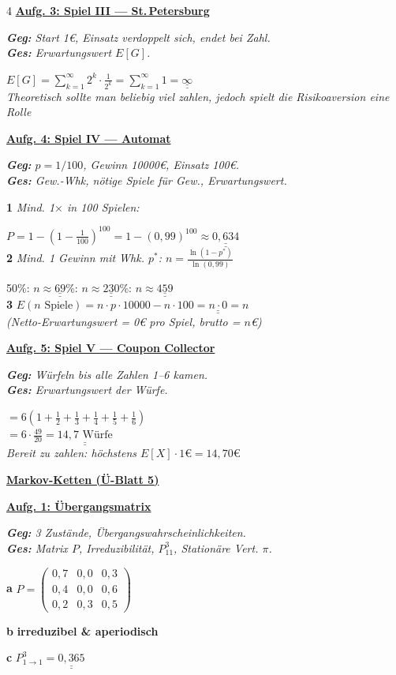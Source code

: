 \documentclass[landscape,a4paper,8pt]{article}
\newcommand{\aufgabe}[1]{\vspace{1pt}\textbf{\underline{#1}}\par}
\newcommand{\blatt}[1]{\smallskip\begin{center}\textbf{\normalsize\underline{#1}}\end{center}\par}
\newcommand{\teil}[1]{\textbf{#1}\;}
\newcommand{\erkl}[1]{{\small\textit{#1}}\par}
\newcommand{\erg}[1]{\underline{\underline{#1}}}
\begin{document}
\begin{multicols*}{4}
\aufgabe{Aufg. 3: Spiel III — St.\,Petersburg}
\erkl{\textbf{Geg:} Start 1€, Einsatz verdoppelt sich, endet bei Zahl.\\\textbf{Ges:} Erwartungswert $E[G]$.}
$E[G]=\displaystyle\sum_{k=1}^{\infty}2^k\cdot\frac{1}{2^k}=\sum_{k=1}^{\infty}1=\erg{\infty}$\\
\erkl{Theoretisch sollte man beliebig viel zahlen, jedoch spielt die Risikoaversion eine Rolle}

\aufgabe{Aufg. 4: Spiel IV — Automat}
\erkl{\textbf{Geg:} $p=1/100$, Gewinn 10000€, Einsatz 100€.\\\textbf{Ges:} Gew.-Whk, nötige Spiele für Gew., Erwartungswert.}
\teil{1} \erkl{Mind. 1$\times$ in 100 Spielen:}
$P=1-(1-\tfrac{1}{100})^{100}=1-(0{,}99)^{100}\approx\erg{0{,}634}$\\
\teil{2} \erkl{Mind. 1 Gewinn mit Whk. $p^*$: $n=\frac{\ln(1-p^*)}{\ln(0{,}99)}$}
50\%: $n\approx\erg{69}$\%: $n\approx\erg{230}$\%: $n\approx\erg{459}$\\
\teil{3} $E(n\text{ Spiele})=n\cdot p\cdot10000-n\cdot100=\erg{n\cdot0}=n$\\
\erkl{(Netto-Erwartungswert = 0€ pro Spiel, brutto = $n$€)}

\aufgabe{Aufg. 5: Spiel V — Coupon Collector}
\erkl{\textbf{Geg:} Würfeln bis alle Zahlen 1–6 kamen.\\\textbf{Ges:} Erwartungswert der Würfe.}
$=6\!\left(1+\tfrac{1}{2}+\tfrac{1}{3}+\tfrac{1}{4}+\tfrac{1}{5}+\tfrac{1}{6}\right)$\\
$=6\cdot\tfrac{49}{20}=\erg{14{,}7\text{ Würfe}}$\\
\erkl{Bereit zu zahlen: höchstens $E[X]\cdot 1\text{€}=14{,}70\text{€}$}


\blatt{Markov-Ketten (Ü-Blatt 5)}

\aufgabe{Aufg. 1: Übergangsmatrix}
\erkl{\textbf{Geg:} 3 Zustände, Übergangswahrscheinlichkeiten.\\\textbf{Ges:} Matrix $P$, Irreduzibilität, $P^3_{11}$, Stationäre Vert. $\pi$.}
\teil{a}
$P=\begin{pmatrix}0{,}7 & 0{,}0 & 0{,}3\\0{,}4 & 0{,}0 & 0{,}6\\0{,}2 & 0{,}3 & 0{,}5\end{pmatrix}$

\teil{b} \textbf{irreduzibel \& aperiodisch}

\teil{c} $P^3_{1\to1}=\erg{0{,}365}$


\end{multicols*}
\end{document}
